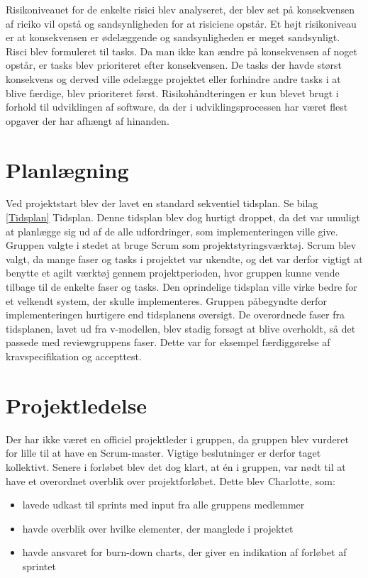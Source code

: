 Risikoniveauet for de enkelte risici blev analyseret, der blev set på konsekvensen af riciko vil opstå og sandsynligheden for at risiciene opstår. Et højt risikoniveau er at konsekvensen er ødelæggende og sandsynligheden er meget sandsynligt. Risci blev formuleret til tasks. Da man ikke kan ændre på konsekvensen af noget opstår, er tasks blev prioriteret efter konsekvensen. De tasks der havde størst konsekvens og derved ville ødelægge projektet eller forhindre andre tasks i at blive færdige, blev prioriteret først. Risikohåndteringen er kun blevet brugt i forhold til udviklingen af software, da der i udviklingsprocessen har været flest opgaver der har afhængt af hinanden.

\section{Planlægning}
Ved projektstart blev der lavet en standard sekventiel tidsplan. Se bilag \ref{Tidsplan} Tidsplan. Denne tidsplan blev dog hurtigt droppet, da det var umuligt at planlægge sig ud af de alle udfordringer, som implementeringen ville give. Gruppen valgte i stedet at bruge Scrum som projektstyringsværktøj. Scrum blev valgt, da mange faser og tasks i projektet var ukendte, og det var derfor vigtigt at benytte et agilt værktøj gennem projektperioden, hvor gruppen kunne vende tilbage til de enkelte faser og tasks. Den oprindelige tidsplan ville virke bedre for et velkendt system, der skulle implementeres. Gruppen påbegyndte derfor implementeringen hurtigere end tidsplanens oversigt. De overordnede faser fra tidsplanen, lavet ud fra v-modellen, blev stadig forsøgt at blive overholdt, så det passede med reviewgruppens faser. Dette var for eksempel færdiggørelse af kravspecifikation og accepttest. 

\section{Projektledelse}
Der har ikke været en officiel projektleder i gruppen, da gruppen blev vurderet for lille til at have en Scrum-master. Vigtige beslutninger er derfor taget kollektivt. Senere i forløbet blev det dog klart, at én i gruppen, var nødt til at have et overordnet overblik over projektforløbet. Dette blev Charlotte, som: 
\begin{itemize}
\item lavede udkast til sprints  med input fra alle gruppens medlemmer
\item havde overblik over hvilke elementer, der manglede i projektet
\item havde ansvaret for burn-down charts, der giver en indikation af forløbet af sprintet
\end{itemize} 

